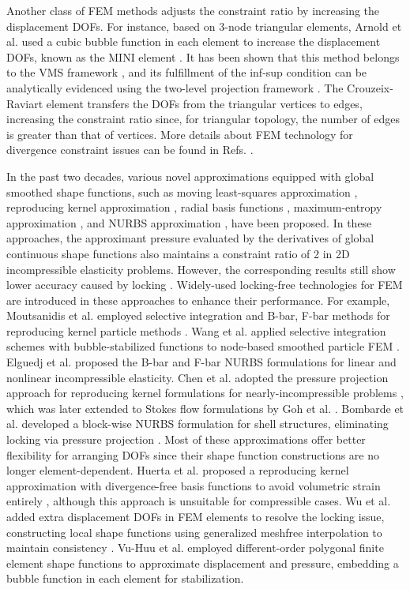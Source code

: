 Another class of FEM methods adjusts the constraint ratio by increasing the displacement DOFs. For instance, based on 3-node triangular elements, Arnold et al. used a cubic bubble function in each element to increase the displacement DOFs, known as the MINI element \cite{arnold1984,auricchio2005}. It has been shown that this method belongs to the VMS framework \cite{quarteroni1994}, and its fulfillment of the inf-sup condition can be analytically evidenced using the two-level projection framework \cite{brezzi0000}. The Crouzeix-Raviart element \cite{crouzeix1973} transfers the DOFs from the triangular vertices to edges, increasing the constraint ratio since, for triangular topology, the number of edges is greater than that of vertices. More details about FEM technology for divergence constraint issues can be found in Refs. \cite{hughes2000,bathe1996,brink1996}.

In the past two decades, various novel approximations equipped with global smoothed shape functions, such as moving least-squares approximation \cite{belytschko1994}, reproducing kernel approximation \cite{liu1995}, radial basis functions \cite{chi2014,wang2020d}, maximum-entropy approximation \cite{ortiz-bernardin2015}, and NURBS approximation \cite{hughes2005,auricchio2010}, have been proposed. In these approaches, the approximant pressure evaluated by the derivatives of global continuous shape functions also maintains a constraint ratio of 2 in 2D incompressible elasticity problems. However, the corresponding results still show lower accuracy caused by locking \cite{huerta2001,dolbow1999a}. Widely-used locking-free technologies for FEM are introduced in these approaches to enhance their performance. For example, Moutsanidis et al. employed selective integration and B-bar, F-bar methods for reproducing kernel particle methods \cite{moutsanidis2020,moutsanidis2021}. Wang et al. applied selective integration schemes with bubble-stabilized functions to node-based smoothed particle FEM \cite{wang2022c}. Elguedj et al. proposed the B-bar and F-bar NURBS formulations for linear and nonlinear incompressible elasticity. Chen et al. adopted the pressure projection approach for reproducing kernel formulations for nearly-incompressible problems \cite{chen2000}, which was later extended to Stokes flow formulations by Goh et al. \cite{goh2018}. Bombarde et al. developed a block-wise NURBS formulation for shell structures, eliminating locking via pressure projection \cite{bombarde2022}. Most of these approximations offer better flexibility for arranging DOFs since their shape function constructions are no longer element-dependent. Huerta et al. proposed a reproducing kernel approximation with divergence-free basis functions to avoid volumetric strain entirely \cite{huerta2004a}, although this approach is unsuitable for compressible cases. Wu et al. added extra displacement DOFs in FEM elements to resolve the locking issue, constructing local shape functions using generalized meshfree interpolation to maintain consistency \cite{wu2012}. Vu-Huu et al. employed different-order polygonal finite element shape functions to approximate displacement and pressure, embedding a bubble function in each element for stabilization.

